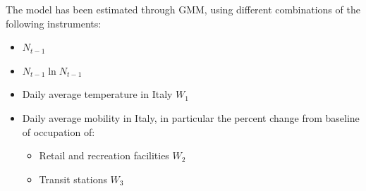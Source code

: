 \documentclass[12pt]{article}
\begin{document}

    The model has been estimated through GMM, using different combinations of the following instruments:
    \begin{itemize}
        \item $N_{t-1}$
        \item $N_{t-1}  \ln N_{t-1}$
        \item Daily average temperature in Italy $W_1$
        \item Daily average mobility in Italy, in particular the percent change from baseline of occupation of:
        \begin{itemize}
            \item Retail and recreation facilities $W_2$
            \item Transit stations $W_3$
        \end{itemize}
    \end{itemize}
\end{document}
